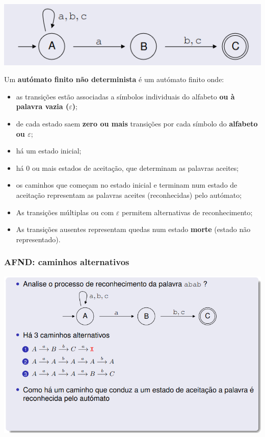 \documentclass{article}
\begin{document}
\begin{flushleft}
  \begin{center}
    \includegraphics[scale=0.45]{46}
  \end{center}

  \item Um \textbf{autómato finito não determinista} é um autómato finito onde:
  \begin{itemize}
    \item as transições estão associadas a símbolos individuais do alfabeto \textbf{ou à palavra vazia ($\varepsilon$)};
    \item de cada estado saem \textbf{zero ou mais} transições por cada símbolo do \textbf{alfabeto ou $\varepsilon$};
    \item há um estado inicial;
    \item há 0 ou mais estados de aceitação, que determinam as palavras aceites;
    \item os caminhos que começam no estado inicial e terminam num estado de aceitação representam as palavras aceites (reconhecidas) pelo autómato;
    \item As transições múltiplas ou com $\varepsilon$ permitem alternativas de reconhecimento;
    \item As transições ausentes representam quedas num estado \textbf{morte} (estado não representado).
  \end{itemize}

  \subsubsection{AFND: caminhos alternativos}

  \begin{center}
    \includegraphics[scale=0.4]{47}
  \end{center}


\end{flushleft}
\end{document}
